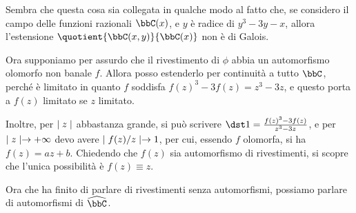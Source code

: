 Sembra che questa cosa sia collegata in qualche modo al fatto che, se considero il campo delle funzioni razionali $\bbC(x)$, e $y$ è radice di $y^3-3y-x$, allora l'estensione $\quotient{\bbC(x,y)}{\bbC(x)}$ non è di Galois.

Ora supponiamo per assurdo che il rivestimento di $\phi$ abbia un automorfismo olomorfo non banale $f$. Allora posso estenderlo per continuità a tutto $\bbC$, perché è limitato in quanto $f$ soddisfa $f(z)^3-3f(z)=z^3-3z$, e questo porta a $f(z)$ limitato se $z$ limitato.

Inoltre, per $\mid z \mid$ abbastanza grande, si può scrivere $\dst 1=\frac{f(z)^3-3f(z)}{z^3-3z}$, e per $\mid z \mid\rightarrow+\infty$ devo avere $\mid f(z)/z \mid\rightarrow1$, per cui, essendo $f$ olomorfa, si ha $f(z)=az+b$. Chiedendo che $f(z)$ sia automorfismo di rivestimenti, si scopre che l'unica possibilità è $f(z)\equiv z$.

Ora che ha finito di parlare di rivestimenti senza automorfismi, possiamo parlare di automorfismi di $\oc \bbC$.

